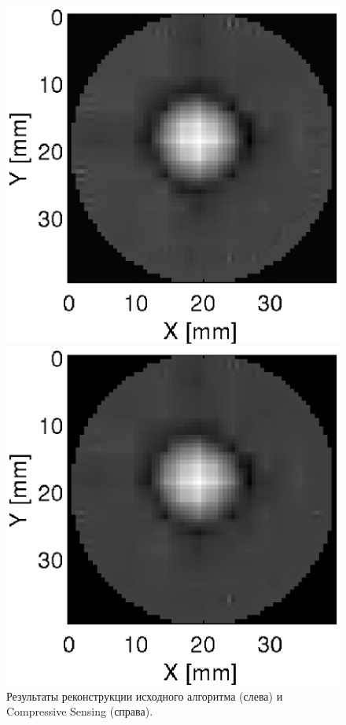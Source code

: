 \documentclass{beamer}
\begin{document}
\begin{frame}
\vspace*{-3mm}
\begin{figure}[!tbp]
    \centering
    \begin{minipage}[b]{0.49\textwidth}
    	\raggedleft
        \includegraphics[scale=0.22]{pics_eps/slice_base_grad.eps}
    \end{minipage}
    \hfill
    \begin{minipage}[b]{0.49\textwidth}
        \raggedright
        \includegraphics[scale=0.22]{pics_eps/slice_cs_grad.eps}
    \end{minipage}
    \caption{\footnotesize Результаты реконструкции исходного алгоритма (слева) и Compressive Sensing (справа).}
\end{figure}

\end{frame}
\end{document}

